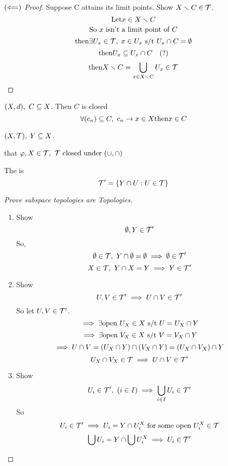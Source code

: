 \documentclass[12pt]{article}
\begin{document}
\bboxproof
\begin{proof}[\((\Longleftarrow)\) Proof]
    Suppose C attains its limit points.
    Show \(X\smallsetminus C\in\mathcal T\).
    \[
        \mathrm{Let} x\in X\smallsetminus C
    \]
    \[
        \text{So }x\text{ isn't a limit point of }C
    \]
    \[
        \mathrm{then}\exists U_x\in\mathcal T,\;x\in U_x\text{ s/t }
        U_x\cap C=\emptyset
    \]
    \[
        \mathrm{then} U_x\subseteq U_x\cap C\quad(?)
    \]
    \[
        \mathrm{then} X\smallsetminus C=
        \bigcup_{x\in X\smallsetminus C}U_x
        \in\mathcal T
    \]
\end{proof}
\ebox

\bboxcoro
\begin{coro}\label{coro:closed_sets_attain_sequence_limits}
    \((X,d),\ C\subseteq X\). Then \(C\) is closed
    \[
        \forall(c_n)\subseteq C,\ c_n\to x\in X
        \mathrm{then} x\in C
    \]
\end{coro}
\ebox


\bboxdefn
\begin{defn}
  \((X,\mathcal T),\;Y\subseteq X\).

  that \(\varphi,X\in\mathcal T,\ \mathcal T\text{ closed under }(\cup,\cap)\)

  The  is 
  \[
  \mathcal T' = \{
  Y \cap U : U \in \mathcal T
  \}
  \]
  \bboxproof
  \begin{proof}[Prove subspace topologies are Topologies]\ 
    \begin{enumerate}
      \item Show
        \[
        \emptyset, Y \in \mathcal T'
        \]
        So,
        \[
        \emptyset\in\mathcal T,\
        Y \cap \emptyset = \emptyset
        \implies \emptyset\in\mathcal T'
        \]
        \[
        X\in\mathcal T,\ Y\cap X=Y
        \implies Y \in \mathcal T'
        \]
      \item Show
        \[
        U,V\in\mathcal T'\implies U\cap V\in\mathcal T'
        \]
        So let \(U,V\in\mathcal T'\).
        \[
        \implies \exists\text{open }U_X\in X\text{ s/t } U=U_X\cap Y
        \]
        \[
        \implies\exists\text{open }V_X\in X\text{ s/t } V=V_X\cap Y
        \]
        \[
        \implies
        U \cap V
        =(U_X\cap Y) \cap (V_X\cap Y)
        =(U_X\cap V_X)\cap Y
        \]
        \[
        U_X\cap V_X\in\mathcal T\implies
        U\cap V\in\mathcal T'
        \]
      \item Show
        \[
        U_i\in\mathcal T',\ (i\in I)\implies\bigcup_{i\in I}U_i\in\mathcal T'
        \]
        So
        \[
        U_i\in\mathcal T'\implies U_i=Y\cap U^X_i\text{ for some open }U^X_i\in\mathcal T
        \]
        \[
        \bigcup U_i=Y\cap\bigcup U^X_i\implies U_i\in\mathcal T'
        \]
    \end{enumerate}
  \end{proof}
  \ebox
\end{defn}
\ebox
\end{document}
